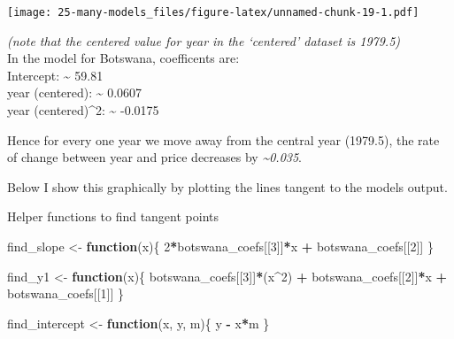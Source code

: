\documentclass[]{book}
\newenvironment{Shaded}{\begin{snugshade}}{\end{snugshade}}
\newcommand{\ControlFlowTok}[1]{\textcolor[rgb]{0.13,0.29,0.53}{\textbf{#1}}}
\newcommand{\DecValTok}[1]{\textcolor[rgb]{0.00,0.00,0.81}{#1}}
\newcommand{\KeywordTok}[1]{\textcolor[rgb]{0.13,0.29,0.53}{\textbf{#1}}}
\newcommand{\NormalTok}[1]{#1}
\newcommand{\OperatorTok}[1]{\textcolor[rgb]{0.81,0.36,0.00}{\textbf{#1}}}
\newcommand{\StringTok}[1]{\textcolor[rgb]{0.31,0.60,0.02}{#1}}
\theoremstyle{definition}
\theoremstyle{definition}
\theoremstyle{definition}
\theoremstyle{remark}
\begin{document}
\begin{enumerate}
  \texttt{[image: 25-many-models\_files/figure-latex/unnamed-chunk-19-1.pdf]}

  \emph{(note that the centered value for year in the `centered' dataset
  is 1979.5)}\\
  In the model for Botswana, coefficents are:\\
  Intercept: \textasciitilde{} 59.81\\
  year (centered): \textasciitilde{} 0.0607\\
  year (centered)\^{}2: \textasciitilde{} -0.0175

  Hence for every one year we move away from the central year (1979.5),
  the rate of change between year and price decreases by
  \emph{\textasciitilde{}0.035}.

  Below I show this graphically by plotting the lines tangent to the
  models output.

\begin{Shaded}
\end{Shaded}

  Helper functions to find tangent points

\begin{Shaded}
\begin{Highlighting}[]
\NormalTok{find_slope <-}\StringTok{ }\ControlFlowTok{function}\NormalTok{(x)\{}
  \DecValTok{2}\OperatorTok{*}\NormalTok{botswana_coefs[[}\DecValTok{3}\NormalTok{]]}\OperatorTok{*}\NormalTok{x }\OperatorTok{+}\StringTok{ }\NormalTok{botswana_coefs[[}\DecValTok{2}\NormalTok{]]}
\NormalTok{\}}

\NormalTok{find_y1 <-}\StringTok{ }\ControlFlowTok{function}\NormalTok{(x)\{}
\NormalTok{  botswana_coefs[[}\DecValTok{3}\NormalTok{]]}\OperatorTok{*}\NormalTok{(x}\OperatorTok{^}\DecValTok{2}\NormalTok{) }\OperatorTok{+}\StringTok{ }\NormalTok{botswana_coefs[[}\DecValTok{2}\NormalTok{]]}\OperatorTok{*}\NormalTok{x }\OperatorTok{+}\StringTok{ }\NormalTok{botswana_coefs[[}\DecValTok{1}\NormalTok{]]}
\NormalTok{\}}

\NormalTok{find_intercept <-}\StringTok{ }\ControlFlowTok{function}\NormalTok{(x, y, m)\{}
\NormalTok{  y }\OperatorTok{-}\StringTok{ }\NormalTok{x}\OperatorTok{*}\NormalTok{m}
\NormalTok{\}}


\end{Highlighting}
\end{Shaded}
\end{enumerate}
\end{document}
